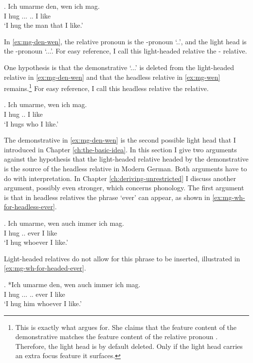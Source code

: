 \exg. Ich umarme den, wen ich mag.\\
I hug ... .. I like\\
`I hug the man that I like.'\label{ex:mg-den-wen}

In \ref{ex:mg-den-wen}, the relative pronoun is the -pronoun  `..', and the light head is the -pronoun  `...'. For easy reference, I call this light-headed relative the - relative.

One hypothesis is that the demonstrative  `...' is deleted from the light-headed relative in \ref{ex:mg-den-wen} and that the headless relative in \ref{ex:mg-wen} remains.\footnote{
This is exactly what \citet{hanink2018} argues for. She claims that the feature content of the demonstrative  matches the feature content of the relative pronoun . Therefore, the light head is by default deleted. Only if the light head carries an extra focus feature it surfaces.
}
For easy reference, I call this headless relative the  relative.

\exg. Ich umarme, wen ich mag.\\
I hug .. I like\\
`I hugs who I like.'\label{ex:mg-wen}

The demonstrative in \ref{ex:mg-den-wen} is the second possible light head that I introduced in Chapter \ref{ch:the-basic-idea}. In this section I give two arguments against the hypothesis that the light-headed relative headed by the demonstrative is the source of the headless relative in Modern German. Both arguments have to do with interpretation. In Chapter \ref{ch:deriving-unrestricted} I discuss another argument, possibly even stronger, which concerns phonology.
The first argument is that in headless relatives the phrase  `ever' can appear, as shown in \ref{ex:mg-wh-for-headless-ever}.

\exg. Ich umarme, wen {auch immer} ich mag.\\
I hug .. ever I like\\
`I hug whoever I like.'\label{ex:mg-wh-for-headless-ever}

Light-headed relatives do not allow for this phrase to be inserted, illustrated in \ref{ex:mg-wh-for-headed-ever}.

\exg. *Ich umarme den, wen {auch immer} ich mag.\\
I hug ... .. ever I like\\
`I hug him whoever I like.'\label{ex:mg-wh-for-headed-ever}

